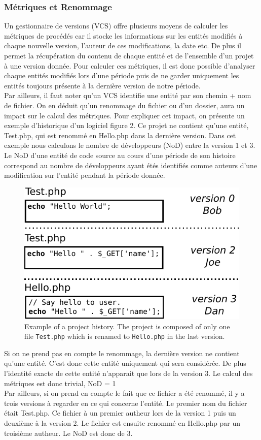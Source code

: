 \subsubsection{Métriques et Renommage}
Un gestionnaire de versions (VCS) offre plusieurs moyens de calculer les métriques de procédés car il stocke les informations sur les entités modifiés à chaque nouvelle version, l'auteur de ces modifications, la date etc. De plus il permet la récupération du contenu de chaque entité et de l'ensemble d'un projet à une version donnée. Pour calculer ces métriques, il est donc possible d'analyser chaque entités modifiés lors d'une période puis de ne garder uniquement les entités toujours présente à la dernière version de notre période.\\
Par ailleurs, il faut noter qu'un VCS identifie une entité par son chemin + nom de fichier. On en déduit qu'un renommage du fichier ou d'un dossier, aura un impact sur le calcul des métriques. Pour expliquer cet impact, on présente un exemple d'historique d'un logiciel figure 2. Ce projet ne contient qu'une entité, Test.php, qui est renommé en Hello.php dans la dernière version. Dans cet exemple nous calculons le nombre de développeurs (NoD) entre la version 1 et 3.\\
Le NoD d'une entité de code source au cours d'une période de son histoire correspond au nombre de développeurs ayant étés identifiés comme auteurs d'une modification sur l'entité pendant la période donnée.\\

\begin{figure}[t]
	\centering
	\includegraphics[width=0.8\linewidth,keepaspectratio]{data/figures/example.pdf}
	\caption{Example of a project history. The project is composed of only one file \texttt{Test.php} which is renamed to \texttt{Hello.php} in the last version.}
	\label{fig:example}
\end{figure}
Si on ne prend pas en compte le renommage, la dernière version ne contient qu'une entité. C'est donc cette entité uniquement qui sera considérée. De plus l'identité exacte de cette entité n'apparait que lors de la version 3. Le calcul des métriques est donc trivial, NoD = 1\\
Par ailleurs, si on prend en compte le fait que ce fichier a été renommé, il y a trois versions à regarder en ce qui concerne l'entité. Le premier nom du fichier était Test.php. Ce fichier à un premier autheur lors de la version 1 puis un deuxième à la version 2. Le fichier est ensuite renommé en Hello.php par un troisième autheur. Le NoD est donc de 3.

